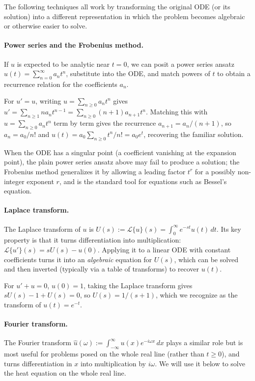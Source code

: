 The following techniques all work by transforming the original ODE (or
its solution) into a different representation in which the problem
becomes algebraic or otherwise easier to solve.

\paragraph{Power series and the Frobenius method.}
If $u$ is expected to be analytic near $t=0$, we can posit a power
series ansatz $u(t) = \sum_{n=0}^\infty a_n t^n$, substitute into the
ODE, and match powers of $t$ to obtain a recurrence relation for the
coefficients $a_n$.

\begin{example}
    For $u' = u$, writing $u = \sum_{n\ge0} a_n t^n$ gives $u' =
    \sum_{n\ge1} n a_n t^{n-1} = \sum_{n\ge0} (n+1) a_{n+1} t^n$.
    Matching this with $u = \sum_{n\ge0} a_n t^n$ term by term gives the
    recurrence $a_{n+1} = a_n/(n+1)$, so $a_n = a_0/n!$ and $u(t) = a_0
    \sum_{n\ge0} t^n/n! = a_0 e^t$, recovering the familiar solution.
\end{example}
When the ODE has a singular point (a coefficient vanishing at the
expansion point), the plain power series ansatz above may fail to
produce a solution; the Frobenius method generalizes it by allowing a
leading factor $t^r$ for a possibly non-integer exponent $r$, and is
the standard tool for equations such as Bessel's equation.

\paragraph{Laplace transform.}
The Laplace transform of $u$ is $U(s) := \mathcal{L}\{u\}(s) =
\int_0^\infty e^{-st} u(t) \, dt$. Its key property is that it turns
differentiation into multiplication: $\mathcal{L}\{u'\}(s) = sU(s) -
u(0)$. Applying it to a linear ODE with constant coefficients turns it
into an \emph{algebraic} equation for $U(s)$, which can be solved and
then inverted (typically via a table of transforms) to recover $u(t)$.

\begin{example}
    For $u' + u = 0$, $u(0)=1$, taking the Laplace transform gives
    $sU(s) - 1 + U(s) = 0$, so $U(s) = 1/(s+1)$, which we recognize as
    the transform of $u(t) = e^{-t}$.
\end{example}

\paragraph{Fourier transform.}
The Fourier transform $\hat u(\omega) := \int_{-\infty}^\infty u(x)
e^{-i\omega x} \, dx$ plays a similar role but is most useful for
problems posed on the whole real line (rather than $t \ge 0$), and
turns differentiation in $x$ into multiplication by $i\omega$. We will
use it below to solve the heat equation on the whole real line.

